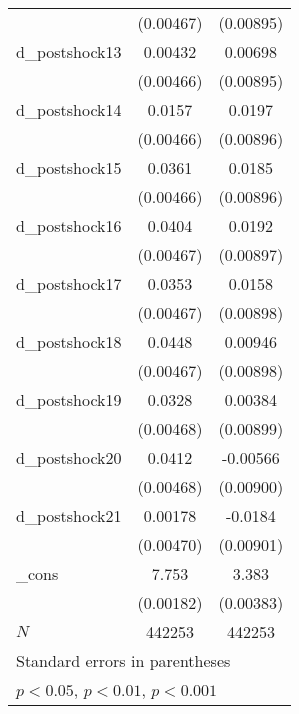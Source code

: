 {\begin{tabular}{l*{2}{c}}
          &(0.00467)         &(0.00895)         \\
d\_postshock13&  0.00432         &  0.00698         \\
          &(0.00466)         &(0.00895)         \\
d\_postshock14&   0.0157\sym{***}&   0.0197\sym{*}  \\
          &(0.00466)         &(0.00896)         \\
d\_postshock15&   0.0361\sym{***}&   0.0185\sym{*}  \\
          &(0.00466)         &(0.00896)         \\
d\_postshock16&   0.0404\sym{***}&   0.0192\sym{*}  \\
          &(0.00467)         &(0.00897)         \\
d\_postshock17&   0.0353\sym{***}&   0.0158         \\
          &(0.00467)         &(0.00898)         \\
d\_postshock18&   0.0448\sym{***}&  0.00946         \\
          &(0.00467)         &(0.00898)         \\
d\_postshock19&   0.0328\sym{***}&  0.00384         \\
          &(0.00468)         &(0.00899)         \\
d\_postshock20&   0.0412\sym{***}& -0.00566         \\
          &(0.00468)         &(0.00900)         \\
d\_postshock21&  0.00178         &  -0.0184\sym{*}  \\
          &(0.00470)         &(0.00901)         \\
\_cons    &    7.753\sym{***}&    3.383\sym{***}\\
          &(0.00182)         &(0.00383)         \\
\hline
\(N\)     &   442253         &   442253         \\
\hline\hline
\multicolumn{3}{l}{\footnotesize Standard errors in parentheses}\\
\multicolumn{3}{l}{\footnotesize \sym{*} \(p<0.05\), \sym{**} \(p<0.01\), \sym{***} \(p<0.001\)}\\
\end{tabular}
}
